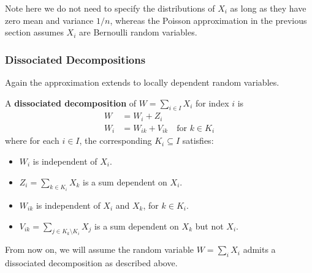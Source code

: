 \documentclass{article}
\begin{document}
\begin{remark}
    Note here we do not need to specify the distributions of $X_i$ as long as they have zero mean and variance $1/n$, whereas the Poisson approximation in the previous section assumes $X_i$ are Bernoulli random variables.  
\end{remark}

\subsubsection{Dissociated Decompositions}
Again the approximation extends to locally dependent random variables.

\begin{definition}\label{def:dissociated_decomposition}
    A \textbf{dissociated decomposition} of $W = \sum_{i\in I} X_i$ for index $i$ is 
    \begin{align*}
        W &= W_i + Z_i \\
        W_i &= W_{ik} + V_{ik} \quad \text{for $k\in K_i$} 
    \end{align*}
    where for each $i\in I$, the corresponding $K_i\subseteq I$ satisfies:  
    \begin{itemize}
        \item $W_i$ is independent of $X_i$.
        \item $Z_i=\sum_{k\in K_i} X_k$ is a sum dependent on $X_i$.
        \item $W_{ik}$ is independent of $X_i$ and $X_k$, for $k\in K_i$.
        \item $V_{ik}=\sum_{j \in K_k\setminus K_i} X_j$ is a sum dependent on $X_k$ but not $X_i$.
    \end{itemize}
\end{definition}

From now on, we will assume the random variable $W = \sum_i X_i$ admits a dissociated decomposition as described above.
\end{document}
